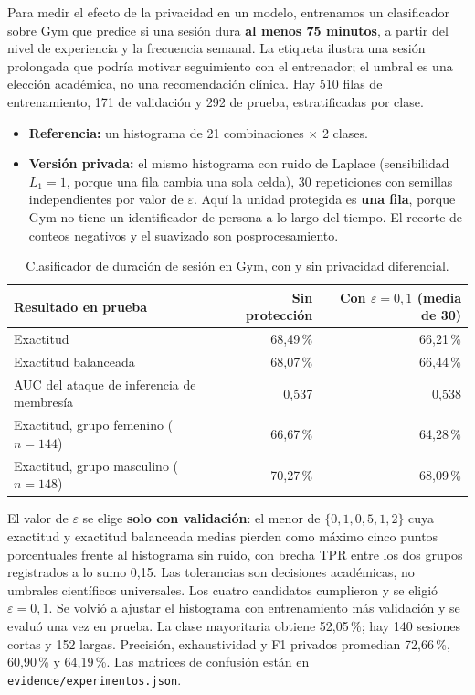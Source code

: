 \documentclass[11pt]{article}
\begin{document}
Para medir el efecto de la privacidad en un modelo, entrenamos un clasificador sobre Gym que predice si una sesión dura \textbf{al menos 75 minutos}, a partir del nivel de experiencia y la frecuencia semanal. La etiqueta ilustra una sesión prolongada que podría motivar seguimiento con el entrenador; el umbral es una elección académica, no una recomendación clínica. Hay 510 filas de entrenamiento, 171 de validación y 292 de prueba, estratificadas por clase.
\begin{itemize}[nosep]
  \item \textbf{Referencia:} un histograma de 21 combinaciones $\times$ 2 clases.
  \item \textbf{Versión privada:} el mismo histograma con ruido de Laplace (sensibilidad $L_1 = 1$, porque una fila cambia una sola celda), 30 repeticiones con semillas independientes por valor de $\varepsilon$. Aquí la unidad protegida es \textbf{una fila}, porque Gym no tiene un identificador de persona a lo largo del tiempo. El recorte de conteos negativos y el suavizado son posprocesamiento.
\end{itemize}

\begin{table}[H]
\centering\small
\begin{tabular}{@{}lrr@{}}
\toprule
\textbf{Resultado en prueba} & \textbf{Sin protección} & \textbf{Con $\varepsilon = 0{,}1$ (media de 30)} \\
\midrule
Exactitud & 68,49\,\% & 66,21\,\% \\
Exactitud balanceada & 68,07\,\% & 66,44\,\% \\
AUC del ataque de inferencia de membresía & 0,537 & 0,538 \\
Exactitud, grupo femenino ($n = 144$) & 66,67\,\% & 64,28\,\% \\
Exactitud, grupo masculino ($n = 148$) & 70,27\,\% & 68,09\,\% \\
\bottomrule
\end{tabular}
\caption{Clasificador de duración de sesión en Gym, con y sin privacidad diferencial.}
\end{table}

El valor de $\varepsilon$ se elige \textbf{solo con validación}: el menor de $\{0{,}1,0{,}5,1,2\}$ cuya exactitud y exactitud balanceada medias pierden como máximo cinco puntos porcentuales frente al histograma sin ruido, con brecha TPR entre los dos grupos registrados a lo sumo 0,15. Las tolerancias son decisiones académicas, no umbrales científicos universales. Los cuatro candidatos cumplieron y se eligió $\varepsilon=0{,}1$. Se volvió a ajustar el histograma con entrenamiento más validación y se evaluó una vez en prueba. La clase mayoritaria obtiene 52,05\,\%; hay 140 sesiones cortas y 152 largas. Precisión, exhaustividad y F1 privados promedian 72,66\,\%, 60,90\,\% y 64,19\,\%. Las matrices de confusión están en \texttt{evidence/experimentos.json}.
\end{document}
